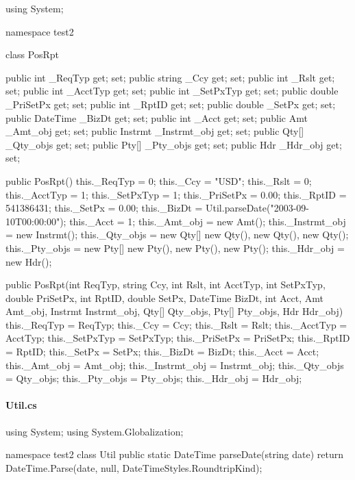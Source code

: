 \documentclass[submission]{eptcs}
\begin{document}
\begin{csharpcode}
using System;

namespace test2{
  class PosRpt {
    public int _ReqTyp { get; set; }
    public string _Ccy { get; set; }
    public int _Rslt { get; set; }
    public int _AcctTyp { get; set; }
    public int _SetPxTyp { get; set; }
    public double _PriSetPx { get; set; }
    public int _RptID { get; set; }
    public double _SetPx { get; set; }
    public DateTime _BizDt { get; set; }
    public int _Acct { get; set; }
    public Amt _Amt_obj { get; set; }
    public Instrmt _Instrmt_obj { get; set; }
    public Qty[] _Qty_objs { get; set; }
    public Pty[] _Pty_objs { get; set; }
    public Hdr _Hdr_obj { get; set; }

    public PosRpt() {
      this._ReqTyp = 0;
      this._Ccy = "USD";
      this._Rslt = 0;
      this._AcctTyp = 1;
      this._SetPxTyp = 1;
      this._PriSetPx = 0.00;
      this._RptID = 541386431;
      this._SetPx = 0.00;
      this._BizDt = Util.parseDate("2003-09-10T00:00:00");
      this._Acct = 1;
      this._Amt_obj = new Amt();
      this._Instrmt_obj = new Instrmt();
      this._Qty_objs = new Qty[] {new Qty(), new Qty(), new Qty()};
      this._Pty_objs = new Pty[] {new Pty(), new Pty(), new Pty()};
      this._Hdr_obj = new Hdr();
    }

    public PosRpt(int ReqTyp, string Ccy, int Rslt, int AcctTyp, int SetPxTyp, double PriSetPx, int RptID,
                  double SetPx, DateTime BizDt, int Acct, Amt Amt_obj, Instrmt Instrmt_obj, Qty[] Qty_objs,
                  Pty[] Pty_objs, Hdr Hdr_obj) {
      this._ReqTyp = ReqTyp;
      this._Ccy = Ccy;
      this._Rslt = Rslt;
      this._AcctTyp = AcctTyp;
      this._SetPxTyp = SetPxTyp;
      this._PriSetPx = PriSetPx;
      this._RptID = RptID;
      this._SetPx = SetPx;
      this._BizDt = BizDt;
      this._Acct = Acct;
      this._Amt_obj = Amt_obj;
      this._Instrmt_obj = Instrmt_obj;
      this._Qty_objs = Qty_objs;
      this._Pty_objs = Pty_objs;
      this._Hdr_obj = Hdr_obj;
    }
  }
}
\end{csharpcode}

\paragraph{Util.cs}

\begin{csharpcode}
using System;
using System.Globalization;

namespace test2 {
  class Util {
    public static DateTime parseDate(string date) {
      return DateTime.Parse(date,  null, DateTimeStyles.RoundtripKind);
    }
  }
}
\end{csharpcode}
\end{document}
